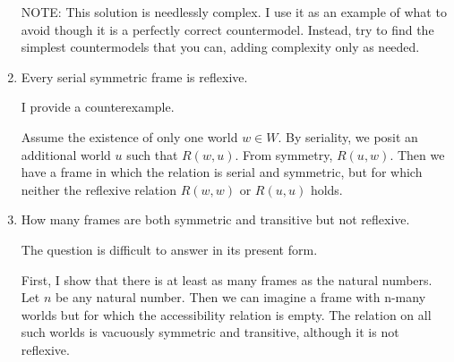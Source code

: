 \documentclass[a4paper, 11pt]{article}                  %
\begin{document}
\begin{enumerate}
{        \noindent
        NOTE: This solution is needlessly complex.
        I use it as an example of what to avoid though it is a perfectly correct countermodel.
        Instead, try to find the simplest countermodels that you can, adding complexity only as needed.


      }

    \item Every serial symmetric frame is reflexive. 
    {I provide a counterexample. 
    
    Assume the existence of only one world $w\in W$. 
    By seriality, we posit an additional world $u$ such that $R(w, u)$.
    From symmetry, $R(u,w)$. 
    Then we have a frame in which the relation is serial and symmetric, 
    but for which neither the reflexive relation $R(w,w)$ or $R(u,u)$ holds.}
      
    \item How many frames are both symmetric and transitive but not reflexive. 
    {The question is difficult to answer in its present form.
    
    First, I show that there is at least as many frames as the natural numbers. 
    Let $n$ be any natural number. 
    Then we can imagine a frame with n-many worlds but for which the accessibility relation is empty. 
    The relation on all such worlds is vacuously symmetric and transitive, although it is not reflexive. 
    
}
\end{enumerate}
\end{document}
